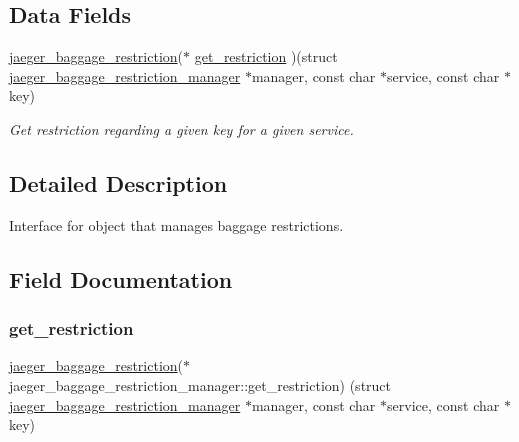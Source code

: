 \subsection*{Data Fields}
\begin{DoxyCompactItemize}
\item 
\mbox{\hyperlink{structjaeger__baggage__restriction}{jaeger\+\_\+baggage\+\_\+restriction}}($\ast$ \mbox{\hyperlink{structjaeger__baggage__restriction__manager_a1b451e0b12cecf51714f8760831fcc40}{get\+\_\+restriction}} )(struct \mbox{\hyperlink{structjaeger__baggage__restriction__manager}{jaeger\+\_\+baggage\+\_\+restriction\+\_\+manager}} $\ast$manager, const char $\ast$service, const char $\ast$key)
\begin{DoxyCompactList}\small\item\em Get restriction regarding a given key for a given service. \end{DoxyCompactList}\end{DoxyCompactItemize}


\subsection{Detailed Description}
Interface for object that manages baggage restrictions. 

\subsection{Field Documentation}
\mbox{\label{structjaeger__baggage__restriction__manager_a1b451e0b12cecf51714f8760831fcc40}} 
\subsubsection{\texorpdfstring{get\+\_\+restriction}{get\_restriction}}
{\footnotesize\ttfamily \mbox{\hyperlink{structjaeger__baggage__restriction}{jaeger\+\_\+baggage\+\_\+restriction}}($\ast$ jaeger\+\_\+baggage\+\_\+restriction\+\_\+manager\+::get\+\_\+restriction) (struct \mbox{\hyperlink{structjaeger__baggage__restriction__manager}{jaeger\+\_\+baggage\+\_\+restriction\+\_\+manager}} $\ast$manager, const char $\ast$service, const char $\ast$key)}




